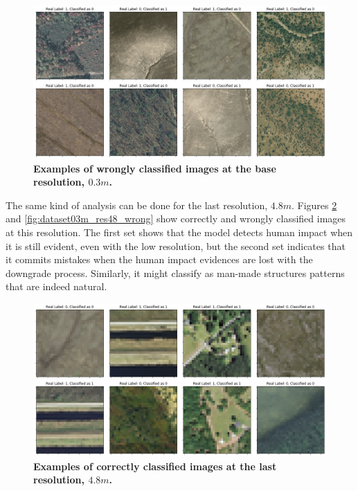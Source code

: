 \begin{figure}[H]
	\centering
	\captionsetup{width=1\linewidth}
	\includegraphics[width=1\textwidth]{Figures/results/class_dataset03m_res03_wrong.png}
	\caption{\textbf{Examples of wrongly classified images at the base resolution,  $0.3m$.}}
	\label{fig:dataset03m_res03_wrong}
\end{figure}

The same kind of analysis can be done for the last resolution, $4.8m$. Figures \ref{fig:dataset03m_res48_correct} and \ref{fig:dataset03m_res48_wrong} show correctly and wrongly classified images at this resolution. The first set shows that the model detects human impact when it is still evident, even with the low resolution, but the second set indicates that it commits mistakes when the human impact evidences are lost with the downgrade process. Similarly, it might classify as man-made structures patterns that are indeed natural.

\begin{figure}[H]
	\centering
	\captionsetup{width=1\linewidth}
	\includegraphics[width=1\textwidth]{Figures/results/class_dataset03m_res48_correct.png}
	\caption{\textbf{Examples of correctly classified images at the last resolution, $4.8m$.}}
	\label{fig:dataset03m_res48_correct}
\end{figure}

